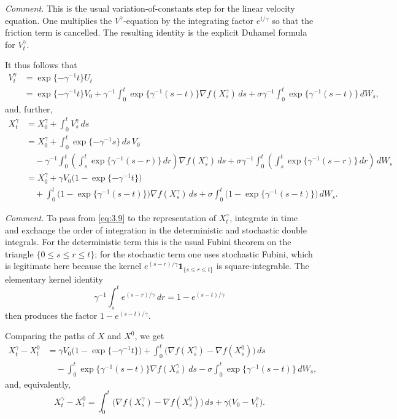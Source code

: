 \documentclass[11pt]{article}
\theoremstyle{remark}
\begin{document}
{\color{teal}
\noindent\emph{Comment.} This is the usual variation-of-constants step for the linear velocity equation. One multiplies the $V^\gamma$-equation by the integrating factor $e^{t/\gamma}$ so that the friction term is cancelled. The resulting identity is the explicit Duhamel formula for $V_t^\gamma$.
}

It thus follows that
\begin{equation}
\label{eq:3.9}
\begin{aligned}
V_t^{\gamma} &= \exp\{-\gamma^{-1}t\}U_t \\
&= \exp\{-\gamma^{-1}t\}V_0+\gamma^{-1}\int_0^t \exp\{\gamma^{-1}(s-t)\}\nabla f(X_s^{\gamma})\,ds+\sigma\gamma^{-1}\int_0^t \exp\{\gamma^{-1}(s-t)\}\,dW_s,
\end{aligned}
\end{equation}
and, further,
\[
\begin{aligned}
X_t^{\gamma} &= X_0^{\gamma}+\int_0^t V_s^{\gamma}\,ds \\
&= X_0^{\gamma}+\int_0^t \exp\{-\gamma^{-1}s\}\,ds\,V_0 \\
&\quad -\gamma^{-1}\int_0^t \left(\int_s^t \exp\{\gamma^{-1}(s-r)\}\,dr\right)\nabla f(X_s^{\gamma})\,ds+\sigma\gamma^{-1}\int_0^t \left(\int_s^t \exp\{\gamma^{-1}(s-r)\}\,dr\right)\,dW_s \\
&= X_0^{\gamma}+\gamma V_0\bigl(1-\exp\{-\gamma^{-1}t\}\bigr) \\
&\quad +\int_0^t \bigl(1-\exp\{\gamma^{-1}(s-t)\}\bigr)\nabla f(X_s^{\gamma})\,ds+\sigma\int_0^t \bigl(1-\exp\{\gamma^{-1}(s-t)\}\bigr)\,dW_s.
\end{aligned}
\]

{\color{teal}
\noindent\emph{Comment.} To pass from \eqref{eq:3.9} to the representation of $X_t^\gamma$, integrate in time and exchange the order of integration in the deterministic and stochastic double integrals. For the deterministic term this is the usual Fubini theorem on the triangle $\{0\le s\le r\le t\}$; for the stochastic term one uses stochastic Fubini, which is legitimate here because the kernel $e^{(s-r)/\gamma}\mathbf 1_{\{s\le r\le t\}}$ is square-integrable. The elementary kernel identity
\[
\gamma^{-1}\int_s^t e^{(s-r)/\gamma}\,dr
=1-e^{(s-t)/\gamma}
\]
then produces the factor $1-e^{(s-t)/\gamma}$.
}

Comparing the paths of $X$ and $X^0$, we get
\begin{equation}
\label{eq:3.10}
\begin{aligned}
X_t^{\gamma}-X_t^0
&= \gamma V_0\bigl(1-\exp\{-\gamma^{-1}t\}\bigr)+\int_0^t \bigl(\nabla f(X_s^{\gamma})-\nabla f(X_s^0)\bigr)\,ds \\
&\quad -\int_0^t \exp\{\gamma^{-1}(s-t)\}\nabla f(X_s^{\gamma})\,ds-\sigma\int_0^t \exp\{\gamma^{-1}(s-t)\}\,dW_s,
\end{aligned}
\end{equation}
and, equivalently,
\[
X_t^{\gamma}-X_t^0=\int_0^t \bigl(\nabla f(X_s^{\gamma})-\nabla f(X_s^0)\bigr)\,ds+\gamma\bigl(V_0-V_t^{\gamma}\bigr).
\]
\end{document}
